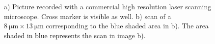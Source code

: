 		\begin{figure}[htp]
			\begin{subfigure}{ 0.49\linewidth}
				\centering
				\caption{}
				\label{subfig::cross_laser_scan_1}
			\end{subfigure}
			\hfill
			\begin{subfigure}{ 0.49\linewidth}
				\centering
				\caption{}
				\label{subfig::pp_pl_scan_1}
			\end{subfigure}
				\caption[Combining \fl and \lsm to identify \nds]{a) Picture recorded with a commercial high resolution laser scanning microscope. Cross marker is visible as well. b) \Pl scan of a $\SI{8}{\micro\metre} \times  \SI{13}{\micro\metre}$ corresponding to the blue shaded area in b). The area shaded in blue represents the \pl scan in image b).}
		\end{figure}


